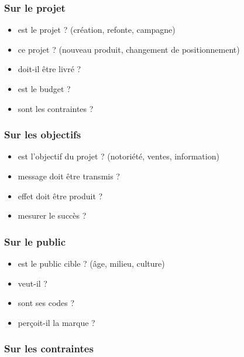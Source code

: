 \subsubsection{Sur le projet}

\begin{itemize}
    \item {} est le projet ? (création, refonte, campagne)
    \item {} ce projet ? (nouveau produit, changement de positionnement)
    \item {} doit-il être livré ?
    \item {} est le budget ?
    \item {} sont les contraintes ?
\end{itemize}

\subsubsection{Sur les objectifs}

\begin{itemize}
    \item {} est l'objectif du projet ? (notoriété, ventes, information)
    \item {} message doit être transmis ?
    \item {} effet doit être produit ?
    \item {} mesurer le succès ?
\end{itemize}

\subsubsection{Sur le public}

\begin{itemize}
    \item {} est le public cible ? (âge, milieu, culture)
    \item {} veut-il ?
    \item {} sont ses codes ?
    \item {} perçoit-il la marque ?
\end{itemize}

\subsubsection{Sur les contraintes}

